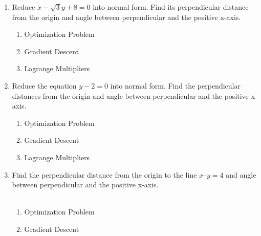 \begin{enumerate}[label=\thechapter.\arabic*,ref=\thechapter.\theenumi]

\item Reduce $x-\sqrt{3}y+8=0$ into normal form. Find its perpendicular distance from the origin and angle between perpendicular and the positive x-axis. 
\\
\solution 
		\begin{enumerate}
			\item Optimization Problem
				\\
\label{11/10/3/3/1/conv}

\item Gradient Descent
	\\
\label{11/10/3/3/1/grad}

			\item Lagrange Multipliers
				\\
\label{11/10/3/3/1/lagmul}

		\end{enumerate}
\item Reduce the equation $y-2=0$ into normal form. Find the perpendicular distances from the origin and angle between perpendicular and the positive x-axis.
\\
\solution 
		\begin{enumerate}
			\item Optimization Problem
				\\
\label{11/10/3/3/2/conv}

\item Gradient Descent
	\\
\label{11/10/3/3/2/grad}

			\item Lagrange Multipliers
				\\
\label{11/10/3/3/2/lagmul}

		\end{enumerate}
\item Find the perpendicular distance from the origin to the line $x – y = 4$ and angle between perpendicular and the positive x-axis.\\
\\
\solution 
		\begin{enumerate}
			\item Optimization Problem
				\\
\label{11/10/3/3/3/conv}

\item Gradient Descent

\end{enumerate}
\end{enumerate}
